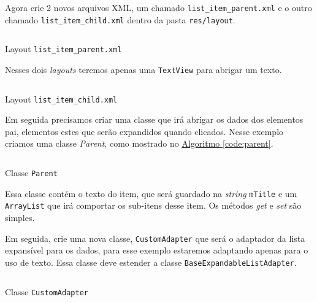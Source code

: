 \documentclass[a4paper,12pt,brazil,oneside]{book}
\begin{document}
\begin{singlespace}
Agora crie 2 novos arquivos XML, um chamado \texttt{list\_item\_parent.xml} e o outro chamado \texttt{list\_item\_child.xml} dentro da pasta \texttt{res/layout}.

\begin{listing}[H]
\inputminted[linenos=true,fontsize=\small,frame=lines, framesep=2mm, tabsize=2,numbersep=5pt]{xml}{src/design/list-item-parent.xml}
\caption{Layout \texttt{list\_item\_parent.xml}}
\end{listing}	

Nesses dois \emph{layouts} teremos apenas uma \texttt{TextView} para abrigar um texto.

\begin{listing}[H]
\inputminted[linenos=true,fontsize=\small,frame=lines, framesep=2mm, tabsize=2,numbersep=5pt]{xml}{src/design/list-item-child.xml}
\caption{Layout \texttt{list\_item\_child.xml}}
\end{listing}	

Em seguida precisamos criar uma classe que irá abrigar os dados dos elementos pai, elementos estes que serão expandidos quando clicados. Nesse exemplo criamos uma classe \emph{Parent}, como mostrado no \hyperref[code:parent]{Algoritmo \ref*{code:parent}}.

\begin{listing}[H]
\inputminted[linenos=true,fontsize=\small,frame=lines, framesep=2mm, tabsize=2,numbersep=5pt]{java}{src/design/parent.java}
\caption{Classe \texttt{Parent}}
\label{code:parent}
\end{listing}	

Essa classe contém o texto do item, que será guardado na \emph{string} \texttt{mTitle} e um \texttt{ArrayList} que irá comportar os sub-itens desse item. Os métodos \emph{get} e \emph{set} são simples.

Em seguida, crie uma nova classe, \texttt{CustomAdapter} que será o adaptador da lista expansível para os dados, para esse exemplo estaremos adaptando apenas para o uso de texto. Essa classe deve estender a classe \texttt{BaseExpandableListAdapter}.

\newenvironment{code}{\captionsetup{type=listing}}{}

\begin{code}
\inputminted[linenos=true,fontsize=\small,frame=lines, framesep=2mm, tabsize=2,numbersep=5pt]{java}{src/design/customadapter.java}
\caption{Classe \texttt{CustomAdapter}}
\end{code}

\parskip 1pt 


\end{singlespace}
\end{document}
